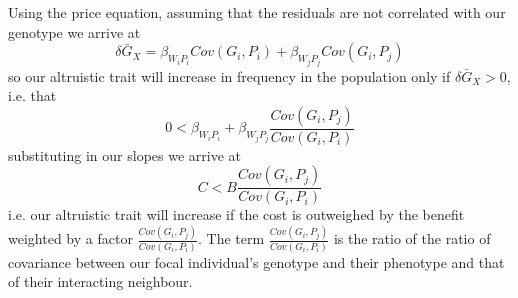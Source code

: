 Using the price equation, assuming that the residuals are not
correlated with our genotype we arrive at
\begin{equation}
\delta \bar{G}_X = \beta_{W_i P_i} Cov(G_i,P_i) +  \beta_{W_j P_j} Cov(G_i,P_j) 
\end{equation}
so our  altruistic trait will increase in frequency in the
population only if $\delta \bar{G}_X >0$, i.e. that 
\begin{equation}
0<\beta_{W_i P_i}  + \beta_{W_j P_j} \frac{Cov(G_i,P_j)}{Cov(G_i,P_i)} 
\end{equation}
substituting in our slopes we arrive at 
\begin{equation}
C<  B \frac{Cov(G_i,P_j)}{Cov(G_i,P_i)} 
\end{equation}
i.e. our altruistic trait will increase if the cost is outweighed by
the benefit weighted by a factor $\frac{Cov(G_i,P_j)}{Cov(G_i,P_i)}$. The term $\frac{Cov(G_i,P_j)}{Cov(G_i,P_i)}$ 
is the ratio of the ratio of covariance between our focal
individual's genotype and their phenotype and that of their
interacting neighbour. 